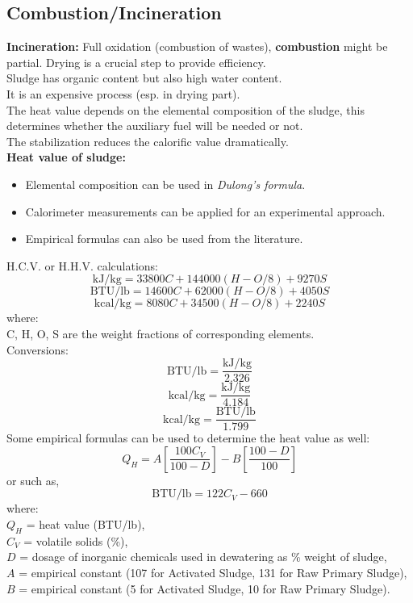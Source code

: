 \documentclass{article}
\numberwithin{equation}{section}
\begin{document}
\subsection{Combustion/Incineration}
\textbf{Incineration:} Full oxidation (combustion of wastes), \textbf{combustion} might be partial. Drying is a crucial step to provide efficiency.\\
Sludge has organic content but also high water content.\\
It is an expensive process (esp. in drying part).\\
The heat value depends on the elemental composition of the sludge, this determines whether the auxiliary fuel will be needed or not.\\
The stabilization reduces the calorific value dramatically.\\
\textbf{Heat value of sludge:}
\begin{itemize}
    \item Elemental composition can be used in \textsl{Dulong's formula}.
    \item Calorimeter measurements can be applied for an experimental approach.
    \item Empirical formulas can also be used from the literature.
\end{itemize}
H.C.V. or H.H.V. calculations:
\[
\text{kJ/kg} = 33800 C + 144000 (H - O/8) + 9270 S
\]
\[
\text{BTU/lb} = 14600 C + 62000 (H - O/8) + 4050 S
\]
\[
\text{kcal/kg} = 8080 C + 34500 (H - O/8) + 2240 S
\]
where:\\
C, H, O, S are the weight fractions of corresponding elements.\\
Conversions:
\[
\text{BTU/lb} = \frac{\text{kJ/kg}}{2.326}
\]
\[
\text{kcal/kg} = \frac{\text{kJ/kg}}{4.184}
\]
\[
\text{kcal/kg} = \frac{\text{BTU/lb}}{1.799}
\]
Some empirical formulas can be used to determine the heat value as well:
\[
Q_H = A\left[\frac{100C_V}{100-D}\right] - B\left[\frac{100-D}{100}\right]
\]
or such as,
\[
\text{BTU/lb} = 122C_V - 660
\]
where:\\
$Q_H$ = heat value (BTU/lb),\\
$C_V$ = volatile solids (\%),\\
$D$ = dosage of inorganic chemicals used in dewatering as \% weight of sludge,\\
$A$ = empirical constant (107 for Activated Sludge, 131 for Raw Primary Sludge),\\
$B$ = empirical constant (5 for Activated Sludge, 10 for Raw Primary Sludge).\\
\end{document}
